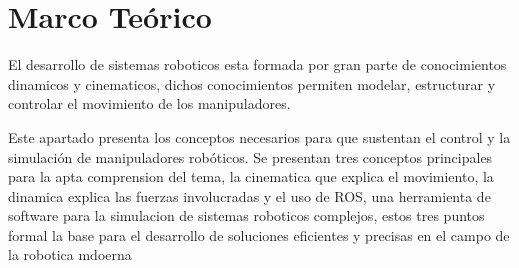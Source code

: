 \chapter{Marco Teórico} 
\label{chap:marco_teorico}

El desarrollo de sistemas roboticos esta formada por gran parte de conocimientos dinamicos y cinematicos, dichos conocimientos permiten modelar, estructurar y controlar el movimiento de los manipuladores. 

Este apartado presenta los conceptos necesarios para que sustentan el control y la simulación de manipuladores robóticos. Se presentan tres conceptos principales para la apta comprension del tema, la cinematica que explica el movimiento, la dinamica explica las fuerzas involucradas y el uso de ROS, una herramienta de software para la simulacion de sistemas roboticos complejos, estos tres puntos formal la base para el desarrollo de soluciones eficientes y precisas en el campo de la robotica mdoerna 

